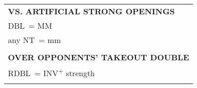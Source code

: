\documentclass{article}
\newcommand\N{{\footnotesize NT}}
\newcommand{\+}{\textsuperscript{+}}
\newcommand{\X}{{\footnotesize{DBL}}}
\newcommand{\XX}{{\footnotesize{RDBL}}}
\newcommand{\m}{m}
\newcommand{\M}{M}
\begin{document}
\begin{adjustbox}{valign=t,minipage={90mm}}
\begin{tabular}{|p{88mm}|}
      \\
      \\
      \hline
      \textbf{VS. ARTIFICIAL STRONG OPENINGS} \\ \hline
      \X\ = MM \\
      any \N\ = mm\\
      \\
      \hline
      \textbf{OVER OPPONENTS' TAKEOUT DOUBLE} \\ \hline
      \XX\ = INV\+ strength\\
      \\
      \hline
    \end{tabular}
  \end{adjustbox}
%
\begin{minipage}{5mm}
  \begin{tabular}{| p{5mm} |}
  \end{tabular}
\end{minipage}
%
\end{document}
